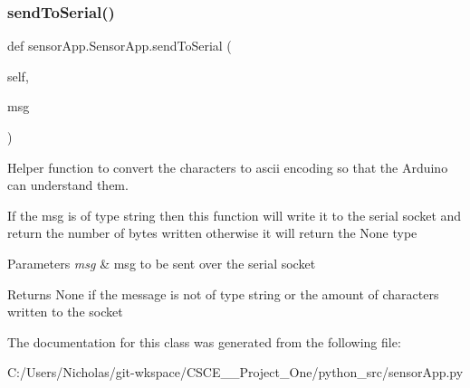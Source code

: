 \subsubsection{\texorpdfstring{send\+To\+Serial()}{sendToSerial()}}
{\footnotesize\ttfamily def sensor\+App.\+Sensor\+App.\+send\+To\+Serial (\begin{DoxyParamCaption}\item[{}]{self,  }\item[{}]{msg }\end{DoxyParamCaption})}



Helper function to convert the characters to ascii encoding so that the Arduino can understand them. 

If the msg is of type string then this function will write it to the serial socket and return the number of bytes written otherwise it will return the None type


\begin{DoxyParams}{Parameters}
{\em msg} & msg to be sent over the serial socket\\
\hline
\end{DoxyParams}
\begin{DoxyReturn}{Returns}
None if the message is not of type string or the amount of characters written to the socket 
\end{DoxyReturn}


The documentation for this class was generated from the following file\+:\begin{DoxyCompactItemize}
\item 
C\+:/\+Users/\+Nicholas/git-\/wkspace/\+C\+S\+C\+E\+\_\+\_\+\+Project\+\_\+\+One/python\+\_\+src/sensor\+App.\+py\end{DoxyCompactItemize}
